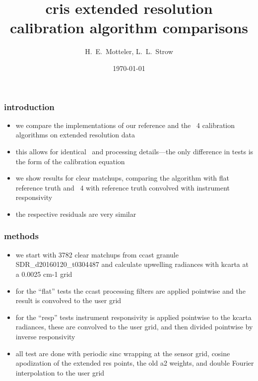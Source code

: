\documentclass[11pt]{beamer}
\title{cris extended resolution \\
       calibration algorithm comparisons \\
}
\author{H.~E.~Motteler, L.~L.~Strow}
\institute{
  UMBC Atmospheric Spectroscopy Lab \\
  Joint Center for Earth Systems Technology \\
}
\date{\today}
\begin{document}
\begin{frame}[plain]
\titlepage
\end{frame}
\begin{frame}
\frametitle{introduction}

\begin{itemize}

  \item we compare the {\umbc} implementations of our {\ccast}
    reference and the \noaa~4 calibration algorithms on extended
    resolution data

  \item this allows for identical \ils\ and processing details---the
    only difference in tests is the form of the calibration equation

  \item we show results for clear matchups, comparing the {\ccast}
    algorithm with flat reference truth and \noaa~4 with reference
    truth convolved with instrument responsivity

  \item the respective residuals are very similar

\end{itemize}

\end{frame}
\begin{frame}
\frametitle{methods}

\begin{itemize}

  \item we start with 3782 clear matchups from ccast granule
    SDR\_d20160120\_t0304487 and calculate upwelling radiances with
    kcarta at a 0.0025 cm-1 grid

  \item for the ``flat'' tests the ccast processing filters are
    applied pointwise and the result is convolved to the {\cris}
    user grid

  \item for the ``resp'' tests instrument responsivity is applied
    pointwise to the kcarta radiances, these are convolved to the
    user grid, and then divided pointwise by inverse responsivity

    
  \item all test are done with periodic sinc wrapping at the sensor
    grid, cosine apodization of the extended res points, the old a2
    weights, and double Fourier interpolation to the user grid

\end{itemize}

\end{frame}
\end{document}
